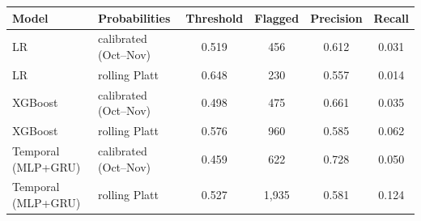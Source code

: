 \begin{tabular}{llcccc}
\toprule
Model & Probabilities & Threshold & Flagged & Precision & Recall \\
\midrule
LR & calibrated (Oct--Nov) & 0.519 & 456 & 0.612 & 0.031 \\
LR & rolling Platt & 0.648 & 230 & 0.557 & 0.014 \\
XGBoost & calibrated (Oct--Nov) & 0.498 & 475 & 0.661 & 0.035 \\
XGBoost & rolling Platt & 0.576 & 960 & 0.585 & 0.062 \\
Temporal (MLP+GRU) & calibrated (Oct--Nov) & 0.459 & 622 & 0.728 & 0.050 \\
Temporal (MLP+GRU) & rolling Platt & 0.527 & 1,935 & 0.581 & 0.124 \\
\bottomrule
\end{tabular}
